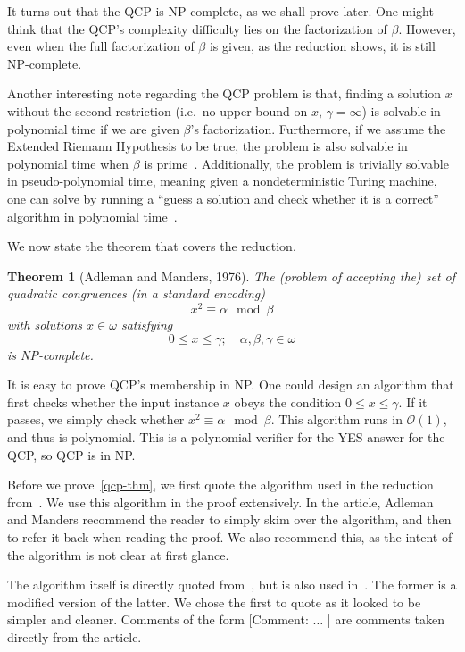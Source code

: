 \documentclass{amsart}
\theoremstyle{plain}
\newtheorem{theorem}{Theorem}
\newcommand{\bigo}{\mathcal{O}}
\begin{document}
It turns out that the QCP is NP-complete, as we shall prove later. One might think that the QCP's
complexity difficulty lies on the factorization of $\beta$. However, even when the full
factorization of $\beta$ is given, as the reduction shows, it is still NP-complete.

Another interesting note regarding the QCP problem is that, finding a solution $x$ without the
second restriction (i.e.\ no upper bound on $x$, $\gamma=\infty$) is solvable in polynomial time if
we are given $\beta$'s factorization. Furthermore, if we assume the Extended Riemann Hypothesis to
be true, the problem is also solvable in polynomial time when $\beta$ is
prime~\cite{garey-johnson}. Additionally, the problem is trivially solvable in pseudo-polynomial
time, meaning given a nondeterministic Turing machine, one can solve by running a ``guess a
solution and check whether it is a correct'' algorithm in polynomial time~\cite{qcp2}.

We now state the theorem that covers the reduction.

\begin{theorem}[Adleman and Manders, 1976]\label{qcp-thm}
  The (problem of accepting the) set of quadratic congruences (in a standard encoding)
  \begin{equation*}
    x^2\equiv\alpha\mod\beta
  \end{equation*}
  with solutions $x\in\omega$ satisfying
  \begin{equation*}
    0\leq x\leq\gamma;\quad \alpha,\beta,\gamma\in\omega
  \end{equation*}
  is NP-complete.
\end{theorem}

It is easy to prove QCP's membership in NP\@. One could design an algorithm that first checks
whether the input instance $x$ obeys the condition $0\leq x\leq\gamma$. If it passes, we simply
check whether $x^2\equiv\alpha\mod\beta$. This algorithm runs in $\bigo(1)$, and thus is
polynomial. This is a polynomial verifier for the YES answer for the QCP, so QCP is in NP\@.

Before we prove~\autoref{qcp-thm}, we first quote the algorithm used in the reduction
from~\cite{qcp2}. We use this algorithm in the proof extensively. In the article, Adleman and
Manders recommend the reader to simply skim over the algorithm, and then to refer it back when
reading the proof. We also recommend this, as the intent of the algorithm is not clear at first
glance.

The algorithm itself is directly quoted from~\cite{qcp2}, but is also used in~\cite{qcp1}. The
former is a modified version of the latter. We chose the first to quote as it looked to be simpler
and cleaner. Comments of the form [Comment: $\ldots$ ] are comments taken directly from the
article.
\end{document}
